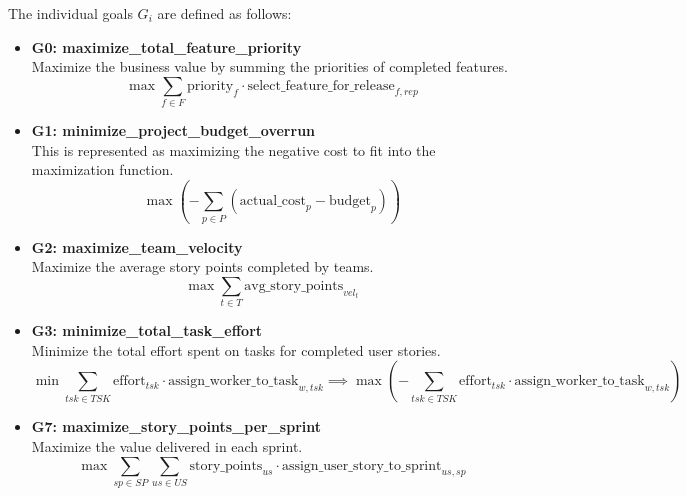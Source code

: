 \documentclass{article}
\begin{document}
The individual goals $G_i$ are defined as follows:
\begin{itemize}
    \item \textbf{G0: maximize\_total\_feature\_priority} \\ Maximize the business value by summing the priorities of completed features.
        $$ \max \sum_{f \in F} \text{priority}_f \cdot \text{select\_feature\_for\_release}_{f, rep} $$
    \item \textbf{G1: minimize\_project\_budget\_overrun} \\ This is represented as maximizing the negative cost to fit into the maximization function.
        $$ \max \left( - \sum_{p \in P} (\text{actual\_cost}_p - \text{budget}_p) \right) $$
    \item \textbf{G2: maximize\_team\_velocity} \\ Maximize the average story points completed by teams.
        $$ \max \sum_{t \in T} \text{avg\_story\_points}_{vel_t} $$
    \item \textbf{G3: minimize\_total\_task\_effort} \\ Minimize the total effort spent on tasks for completed user stories.
        $$ \min \sum_{tsk \in TSK} \text{effort}_{tsk} \cdot \text{assign\_worker\_to\_task}_{w, tsk} \implies \max \left( - \sum_{tsk \in TSK} \text{effort}_{tsk} \cdot \text{assign\_worker\_to\_task}_{w, tsk} \right) $$
    \item \textbf{G7: maximize\_story\_points\_per\_sprint} \\ Maximize the value delivered in each sprint.
        $$ \max \sum_{sp \in SP} \sum_{us \in US} \text{story\_points}_{us} \cdot \text{assign\_user\_story\_to\_sprint}_{us, sp} $$
\end{itemize}
\end{document}
